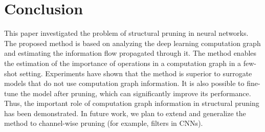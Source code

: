 \cleardoublepage
{}
{}
\section*{Conclusion}

This paper investigated the problem of structural pruning in neural networks. 
The proposed method is based on analyzing the deep learning computation graph and estimating the information flow propagated through it. 
The method enables the estimation of the importance of operations in a computation graph in a few-shot setting. 
Experiments have shown that the method is superior to surrogate models that do not use computation graph information. It is also possible to fine-tune the model after pruning, which can significantly improve its performance. Thus, the important role of computation graph information in structural pruning has been demonstrated. In future work, we plan to extend and generalize the method to channel-wise pruning (for example, filters in CNNs).